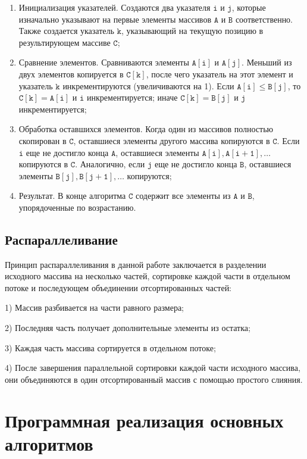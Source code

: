 \documentclass[]{article}
\theoremstyle{remark}
\theoremstyle{definition}
\newcommand{\term}[1]{$\mathtt{#1}$}
\begin{document}
\begin{enumerate}
    \item Инициализация указателей. Создаются два указателя \term{i} и \term{j}, которые изначально указывают на первые элементы массивов \term{A} и \term{B} соответственно. Также создается указатель \term{k}, указывающий на текущую позицию в результирующем массиве \term{C};
    \item Сравнение элементов. Сравниваются элементы \term{A[i]} и \term{A[j]}. Меньший из двух элементов копируется в \term{C[k]}, после чего указатель на этот элемент и указатель \term{k} инкрементируются (увеличиваются на 1). Если \term{A[i] \leq B[j]}, то \term{C[k] = A[i]} и \term{i} инкрементируется; иначе \term{C[k] = B[j]} и \term{j} инкрементируется;
    \item Обработка оставшихся элементов. Когда один из массивов полностью скопирован в \term{C}, оставшиеся элементы другого массива копируются в \term{C}. Если \term{i} еще не достигло конца \term{A}, оставшиеся элементы \term{A[i], A[i+1], \ldots} копируются в \term{C}. Аналогично, если \term{j} еще не достигло конца \term{B}, оставшиеся элементы \term{B[j], B[j+1], \ldots} копируются;
    \item Результат. В конце алгоритма \term{C} содержит все элементы из \term{A} и \term{B}, упорядоченные по возрастанию.
\end{enumerate}

\subsection{Распараллеливание}

\par Принцип распараллеливания в данной работе заключается в разделении исходного массива на несколько частей, сортировке каждой части в отдельном потоке и последующем объединении отсортированных частей:
\par 1) Массив разбивается на части равного размера;
\par 2) Последняя часть получает дополнительные элементы из остатка;
\par 3) Каждая часть массива сортируется в отдельном потоке;
\par 4) После завершения параллельной сортировки каждой части исходного массива, они объединяются в один отсортированный массив с помощью простого слияния.

\newpage

\section{Программная реализация основных алгоритмов}
\end{document}
